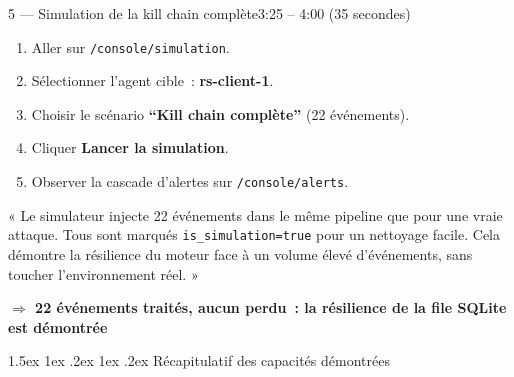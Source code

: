 \documentclass[a4paper,11pt]{article}
\makeatletter
\renewcommand{\section}{\@startsection{section}{1}{\z@}%
  {1.5ex \@plus 1ex \@minus .2ex}%
  {1ex \@plus .2ex}%
  {\large\bfseries\color{ifriblue}}}
\newcommand{\clic}[1]{\texttt{\small #1}}
\newcommand{\resultat}[1]{\textbf{\textcolor{ifriblue}{$\Rightarrow$ #1}}}
\makeatother
\begin{document}
\begin{etapebox}{5 --- Simulation de la kill chain complète}{3:25 -- 4:00 \textnormal{(35 secondes)}}

\begin{montrerbox}
\begin{enumerate}[leftmargin=1.5em,itemsep=3pt]
  \item Aller sur \clic{/console/simulation}.
  \item Sélectionner l'agent cible~: \textbf{rs-client-1}.
  \item Choisir le scénario \textbf{``Kill chain complète''} (22 événements).
  \item Cliquer \textbf{Lancer la simulation}.
  \item Observer la cascade d'alertes sur \clic{/console/alerts}.
\end{enumerate}
\end{montrerbox}

\vspace{5pt}

\begin{direbox}
« Le simulateur injecte 22 événements dans le même pipeline que pour une vraie attaque.
Tous sont marqués \texttt{is\_simulation=true} pour un nettoyage facile.
Cela démontre la résilience du moteur face à un volume élevé d'événements, sans toucher l'environnement réel. »
\end{direbox}

\resultat{22 événements traités, aucun perdu~: la résilience de la file SQLite est démontrée}

\end{etapebox}

\section{Récapitulatif des capacités démontrées}
\end{document}
